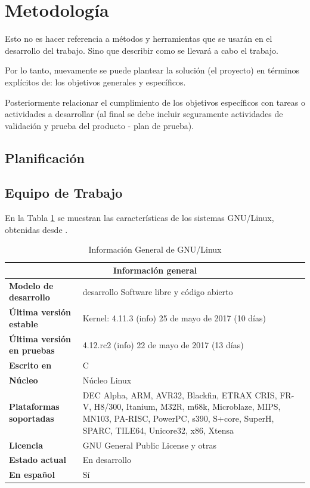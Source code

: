 \documentclass[letter,12pt]{report}
\begin{document}
\section{Metodología}
Esto no es hacer referencia a métodos y herramientas que se usarán en el desarrollo del trabajo. Sino que describir como se llevará a cabo el trabajo.

Por lo tanto, nuevamente se puede plantear la solución (el proyecto) en términos explícitos de: los objetivos generales y específicos.

Posteriormente relacionar el cumplimiento de los objetivos específicos con tareas o actividades a desarrollar (al final se debe incluir seguramente actividades de validación y prueba del producto - plan de prueba).

\subsection{Planificación}
\blindtext %

\subsection{Equipo de Trabajo}
\blindtext %







En la Tabla \ref{t:info} se muestran las características de los sistemas GNU/Linux, obtenidas desde \cite{001}.


\begin{table}[hbt]
\begin{center}
\begin{tabular}{|l|p{10cm}|}\hline
\multicolumn{2}{|c|}{\textbf{Información general}}\\
\hline
\textbf{Modelo de desarrollo}&desarrollo	Software libre y código abierto\\
\textbf{Última versión estable}&Kernel: 4.11.3 (info) 25 de mayo de 2017 (10 días)\\
\textbf{Última versión en pruebas}&	4.12.rc2 (info) 22 de mayo de 2017 (13 días)\\
\textbf{Escrito en}&	C\\
\textbf{Núcleo}&	Núcleo Linux\\
\textbf{Plataformas soportadas}	& DEC Alpha, ARM, AVR32, Blackfin, ETRAX CRIS, FR-V, H8/300, Itanium, M32R, m68k, Microblaze, MIPS, MN103, PA-RISC, PowerPC, s390, S+core, SuperH, SPARC, TILE64, Unicore32, x86, Xtensa\\
\textbf{Licencia}	&GNU General Public License y otras\\
\textbf{Estado actual}	&En desarrollo\\
\textbf{En español}	&Sí\\
\hline
\end{tabular}
\end{center}
\caption{Información General de GNU/Linux}
\label{t:info}
\end{table}
\end{document}

